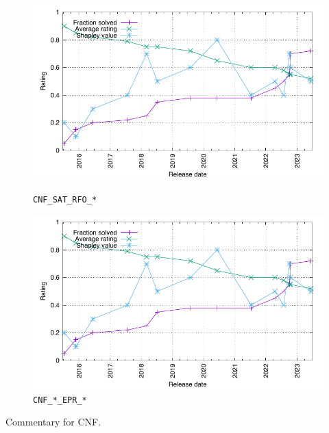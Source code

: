 \documentclass[runningheads]{llncs}
\begin{document}
\begin{figure}[ht!]
\centering
\begin{minipage}[t]{.49\textwidth}
  \centering
  \includegraphics[width=\textwidth]{Plots/GNUPlots/TestData.pdf}
  \vspace*{-2em}
  \caption{{\tt CNF\_SAT\_RFO\_*}}
  \label{Plot_CNF_SAT}
\end{minipage}
\begin{minipage}[t]{.49\textwidth}
  \centering
  \includegraphics[width=\textwidth]{Plots/GNUPlots/TestData.pdf}
  \vspace*{-2em}
  \caption{{\tt CNF\_*\_EPR\_*}}
  \label{Plot_CNF_EPR}
\end{minipage}
\end{figure}

Commentary for CNF.
\end{document}
